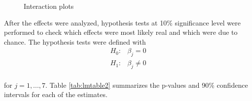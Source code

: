 \documentclass[
]{article}
\begin{document}
\begin{figure}

{\centering {}

}

\caption{Interaction plots}\label{fig:intplots}
\end{figure}

After the effects were analyzed, hypothesis tests at 10\% significance level were performed to check which effects were most likely real and which were due to chance. The hypothesis tests were defined with
\[
\begin{aligned}
H_0:& \beta_j = 0 \\
H_1:& \beta_j \not= 0
\end{aligned}
\]\\
for \(j=1,...,7\). Table \ref{tab:lmtable2} summarizes the p-values and 90\% confidence intervals for each of the estimates.
\end{document}

